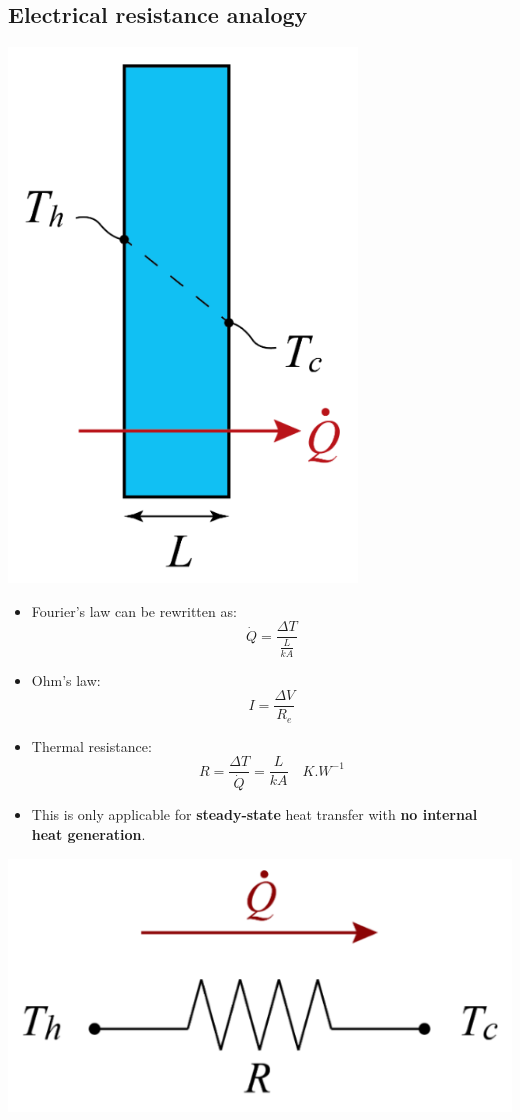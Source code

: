 \documentclass[11pt]{article}
\begin{document}
\subsection{Electrical resistance analogy}
\label{sec:orgf59b07e}
\begin{center}
\includegraphics[scale=0.7]{./images/steady-state-heat-conduction-fouriers-law.png}
\end{center}
\begin{itemize}
\item Fourier's law can be rewritten as:
\[\dot{Q} = \frac{\Delta T}{\frac{L}{kA}}\]
\item Ohm's law:
\[I = \frac{\Delta V}{R_e}\]
\item Thermal resistance:
\[R = \frac{\Delta T}{\dot{Q}} = \frac{L}{kA} \quad \unit{K.W^{-1}}\]
\item This is only applicable for \textbf{steady-state} heat transfer with \textbf{no internal heat generation}.
\end{itemize}
\begin{center}
\includegraphics[scale=0.7]{./images/steady-state-heat-conduction-electrical-resistance-analogy.png}
\end{center}
\end{document}
